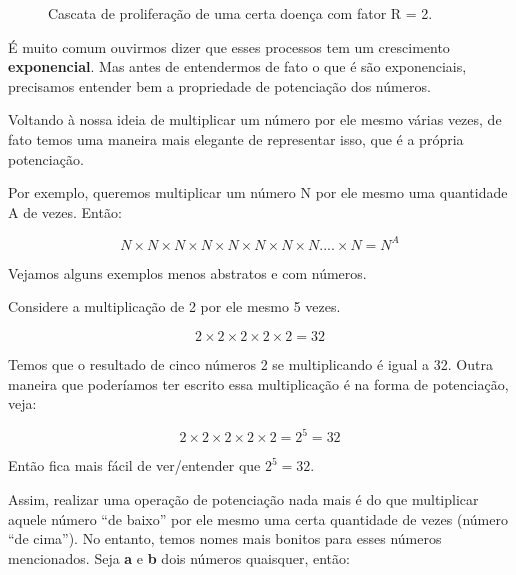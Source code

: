 \begin{figure}[H]
    \centering
    
    \caption{Cascata de proliferação de uma certa doença com fator R = 2.}
    \label{fig:cascata}
\end{figure}

É muito comum ouvirmos dizer que esses processos tem um crescimento \textbf{exponencial}. Mas antes de entendermos de fato o que é são exponenciais, precisamos entender bem a propriedade de potenciação dos números.

Voltando à nossa ideia de multiplicar um número por ele mesmo várias vezes, de fato temos uma maneira mais elegante de representar isso, que é a própria potenciação.

\begin{tcolorbox}[title = Potenciação como várias multiplicações]
    Por exemplo, queremos multiplicar um número N por ele mesmo uma quantidade A de vezes. Então:

    \begin{equation}
        N\times N\times N\times N\times N\times N\times N\times N....\times N = N^A
    \end{equation}
\end{tcolorbox}

Vejamos alguns exemplos menos abstratos e com números.

\begin{exemplo}
    Considere a multiplicação de 2 por ele mesmo 5 vezes.

    \begin{equation}
        2\times 2\times 2\times 2\times 2=32
    \end{equation}

    Temos que o resultado de cinco números 2 se multiplicando é igual a 32. Outra maneira que poderíamos ter escrito essa multiplicação é na forma de potenciação, veja:

    \begin{equation}
        2\times 2\times 2\times 2\times 2 = 2^5=32
    \end{equation}

    Então fica mais fácil de ver/entender que \(2^5=32\).
\end{exemplo}

Assim, realizar uma operação de potenciação nada mais é do que multiplicar aquele número ``de baixo'' por ele mesmo uma certa quantidade de vezes (número ``de cima''). No entanto, temos nomes mais bonitos para esses números mencionados. Seja \textbf{a} e \textbf{b} dois números quaisquer, então:


